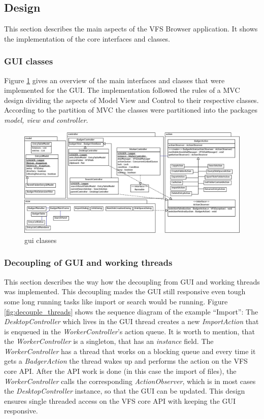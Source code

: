 \subsection{Design}
This section describes the main aspects of the VFS Browser application. It shows
the implementation of the core interfaces and classes.

\subsubsection{GUI classes}\label{sec:guiClasses}
Figure \ref{fig:gui_classes} gives an overview of the main interfaces and
classes that were implemented for the GUI. The implementation followed the rules
of a MVC design dividing the aspects of Model View and Control to their
respective classes. According to the partition of MVC the classes were
partitioned into the packages \textit{model, view and controller}.

\begin{figure}[h!]
\centering
\includegraphics[width=1\textwidth]{figures/gui_classes.eps}
\caption{gui classes}
\label{fig:gui_classes}
\end{figure}


\subsubsection{Decoupling of GUI and working threads}
This section describes the way how the decoupling from GUI and working threads
was implemented. This decoupling mades the GUI still responsive even tough some
long running tasks like import or search would be running. Figure
\ref{fig:decouple_threads} shows the sequence diagram of the example ``Import'':
The \textit{DesktopController} which lives in the GUI thread creates a new
\textit{ImportAction} that is enqueued in the \textit{WorkerController}'s action queue. It is worth to mention, that the
\textit{WorkerController} is a singleton, that has an \textit{instance} field. The
\textit{WorkerController} has a thread that works on a blocking queue and every
time it gets a \textit{BadgerAction} the thread wakes up and performs the action
on the VFS core API. After the API work is done (in this case the import of
files), the \textit{WorkerController} calls the corresponding
\textit{ActionObserver}, which is in most cases the \textit{DesktopController}
instance, so that the GUI can be updated. This design ensures single threaded
access on the VFS core API with keeping the GUI responsive.

